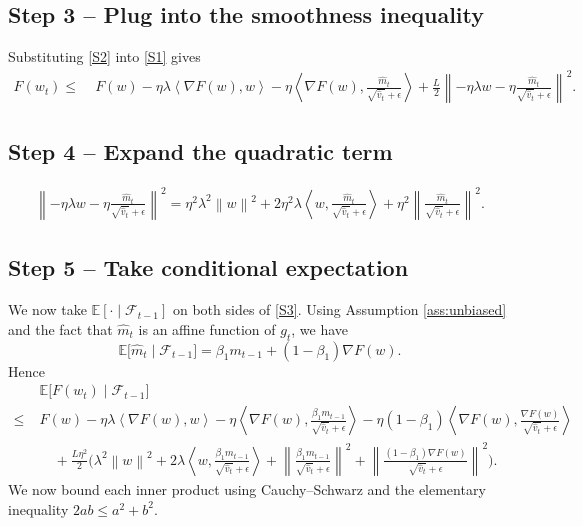 \documentclass{article}
\newcommand{\E}{\mathbb{E}}
\newcommand{\norm}[1]{\left\lVert #1 \right\rVert}
\newcommand{\ip}[2]{\left\langle #1,#2 \right\rangle}
\begin{document}
\subsection*{Step 3 – Plug into the smoothness inequality}
Substituting \eqref{S2} into \eqref{S1} gives
\begin{align}
    F(w_t) \le &\; F(w) -\eta\lambda \ip{\nabla F(w)}{w}
                -\eta \ip{\nabla F(w)}{\frac{\hat m_t}{\sqrt{\hat v_t}+\epsilon}}
                + \frac{L}{2}\norm{-\eta\lambda w - \eta \frac{\hat m_t}{\sqrt{\hat v_t}+\epsilon}}^2 .
    \tag{S3}
\end{align}

\subsection*{Step 4 – Expand the quadratic term}
\begin{align}
    \norm{-\eta\lambda w - \eta \frac{\hat m_t}{\sqrt{\hat v_t}+\epsilon}}^2
    = \eta^2\lambda^2\norm{w}^2
      + 2\eta^2\lambda \ip{w}{\frac{\hat m_t}{\sqrt{\hat v_t}+\epsilon}}
      + \eta^2\norm{\frac{\hat m_t}{\sqrt{\hat v_t}+\epsilon}}^2 .
    \tag{S4}
\end{align}

\subsection*{Step 5 – Take conditional expectation}
We now take $\E[\cdot\mid\mathcal{F}_{t-1}]$ on both sides of \eqref{S3}.  
Using Assumption \ref{ass:unbiased} and the fact that $\hat m_t$ is an affine function of $g_t$, we have
\[
    \E\!\big[\hat m_t\mid\mathcal{F}_{t-1}\big]
        = \beta_1 m_{t-1} + (1-\beta_1)\nabla F(w) .
\]
Hence
\begin{align}
    &\E\!\big[F(w_t)\mid\mathcal{F}_{t-1}\big] \nonumber\\
    \le\;& F(w) -\eta\lambda \ip{\nabla F(w)}{w}
        -\eta \ip{\nabla F(w)}{\frac{\beta_1 m_{t-1}}{\sqrt{\hat v_t}+\epsilon}}
        -\eta (1-\beta_1)\ip{\nabla F(w)}{\frac{\nabla F(w)}{\sqrt{\hat v_t}+\epsilon}} \nonumber\\
    &\quad + \frac{L\eta^2}{2}\bigg(
        \lambda^2\norm{w}^2
        + 2\lambda \ip{w}{\frac{\beta_1 m_{t-1}}{\sqrt{\hat v_t}+\epsilon}}
        + \norm{\frac{\beta_1 m_{t-1}}{\sqrt{\hat v_t}+\epsilon}}^2
        + \norm{\frac{(1-\beta_1)\nabla F(w)}{\sqrt{\hat v_t}+\epsilon}}^2
        \bigg) .
    \tag{S5}
\end{align}
We now bound each inner product using Cauchy–Schwarz and the elementary inequality $2ab\le a^2+b^2$.
\end{document}
